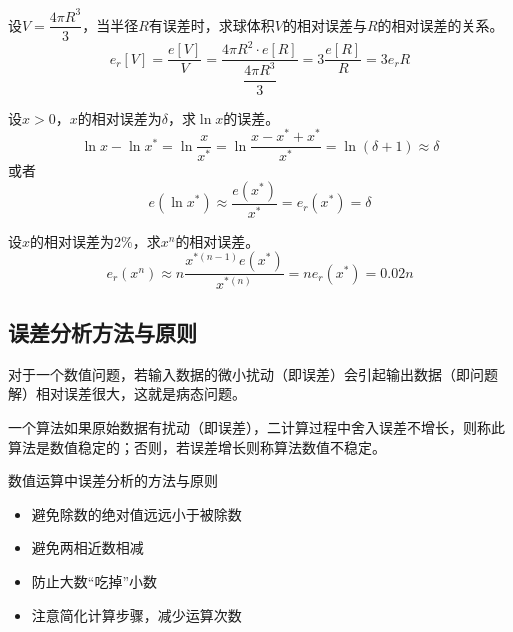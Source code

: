 \begin{example}
    设$V = \dfrac{4\pi R^3}{3}$，当半径$R$有误差时，求球体积$V$的相对误差与$R$的相对误差的关系。
    \[
        e_r[V] = \dfrac{e[V]}{V} = \dfrac{4\pi R^2\cdot e[R]}{\dfrac{4\pi R^3}{3}} = 3\dfrac{e[R]}{R} = 3e_r{R}
    \]
\end{example}
\begin{example}
    设$x>0$，$x$的相对误差为$\delta$，求$\ln x$的误差。
    \[
        \ln x-\ln x^* = \ln \dfrac{x}{x^*} = \ln \dfrac{x-x^*+x^*}{x^*} = \ln (\delta+1)\approx \delta
    \]
    或者
    \[
        e(\ln x^*) \approx \dfrac{e(x^*)}{x^*} = e_r(x^*) = \delta
    \]
\end{example}
\begin{example}
    设$x$的相对误差为$2\%$，求$x^n$的相对误差。
    \[
        e_r(x^n)\approx n\dfrac{x^{*(n-1)}e(x^*)}{x^{*(n)}} = ne_r(x^*) = 0.02n
    \]
\end{example}

\subsection{误差分析方法与原则}
\begin{definition}[病态问题]
    对于一个数值问题，若输入数据的微小扰动（即误差）会引起输出数据（即问题解）相对误差很大，这就是\textcolor{red!50}{病态问题}。
\end{definition}
\begin{definition}[数值稳定性]
    一个算法如果原始数据有扰动（即误差），二计算过程中舍入误差不增长，则称此算法是数值稳定的；否则，若误差增长则称算法数值不稳定。
\end{definition}
\begin{note}
    数值运算中误差分析的方法与原则
    \begin{itemize}
        \item 避免除数的绝对值远远小于被除数
        \item 避免两相近数相减
        \item 防止大数“吃掉”小数
        \item 注意简化计算步骤，减少运算次数
    \end{itemize}
\end{note}